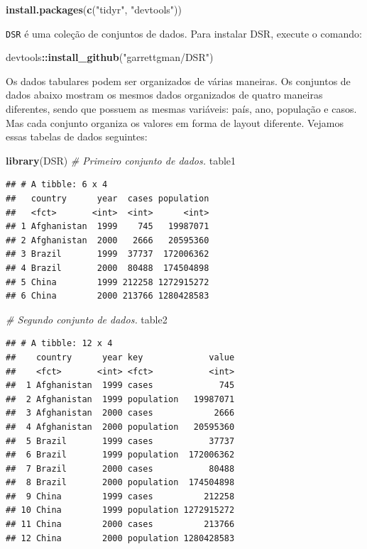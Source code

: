 \documentclass[a4paper]{book}
\newenvironment{Shaded}{\begin{snugshade}}{\end{snugshade}}
\newcommand{\CommentTok}[1]{\textcolor[rgb]{0.56,0.35,0.01}{\textit{#1}}}
\newcommand{\KeywordTok}[1]{\textcolor[rgb]{0.13,0.29,0.53}{\textbf{#1}}}
\newcommand{\NormalTok}[1]{#1}
\newcommand{\OperatorTok}[1]{\textcolor[rgb]{0.81,0.36,0.00}{\textbf{#1}}}
\newcommand{\StringTok}[1]{\textcolor[rgb]{0.31,0.60,0.02}{#1}}
\begin{document}
\begin{Shaded}
\begin{Highlighting}[]
\KeywordTok{install.packages}\NormalTok{(}\KeywordTok{c}\NormalTok{(}\StringTok{"tidyr"}\NormalTok{, }\StringTok{"devtools"}\NormalTok{))}
\end{Highlighting}
\end{Shaded}

\texttt{DSR} é uma coleção de conjuntos de dados. Para instalar DSR, execute o comando:

\begin{Shaded}
\begin{Highlighting}[]
\NormalTok{devtools}\OperatorTok{::}\KeywordTok{install_github}\NormalTok{(}\StringTok{"garrettgman/DSR"}\NormalTok{)}
\end{Highlighting}
\end{Shaded}

Os dados tabulares podem ser organizados de várias maneiras. Os conjuntos de dados abaixo mostram os mesmos dados organizados de quatro maneiras diferentes, sendo que possuem as mesmas variáveis: país, ano, população e casos. Mas cada conjunto organiza os valores em forma de layout diferente. Vejamos essas tabelas de dados seguintes:

\begin{Shaded}
\begin{Highlighting}[]
\KeywordTok{library}\NormalTok{(DSR)}
\CommentTok{# Primeiro conjunto de dados.}
\NormalTok{table1}
\end{Highlighting}
\end{Shaded}

\begin{verbatim}
## # A tibble: 6 x 4
##   country      year  cases population
##   <fct>       <int>  <int>      <int>
## 1 Afghanistan  1999    745   19987071
## 2 Afghanistan  2000   2666   20595360
## 3 Brazil       1999  37737  172006362
## 4 Brazil       2000  80488  174504898
## 5 China        1999 212258 1272915272
## 6 China        2000 213766 1280428583
\end{verbatim}

\begin{Shaded}
\begin{Highlighting}[]
\CommentTok{# Segundo conjunto de dados.}
\NormalTok{table2}
\end{Highlighting}
\end{Shaded}

\begin{verbatim}
## # A tibble: 12 x 4
##    country      year key             value
##    <fct>       <int> <fct>           <int>
##  1 Afghanistan  1999 cases             745
##  2 Afghanistan  1999 population   19987071
##  3 Afghanistan  2000 cases            2666
##  4 Afghanistan  2000 population   20595360
##  5 Brazil       1999 cases           37737
##  6 Brazil       1999 population  172006362
##  7 Brazil       2000 cases           80488
##  8 Brazil       2000 population  174504898
##  9 China        1999 cases          212258
## 10 China        1999 population 1272915272
## 11 China        2000 cases          213766
## 12 China        2000 population 1280428583
\end{verbatim}
\end{document}
